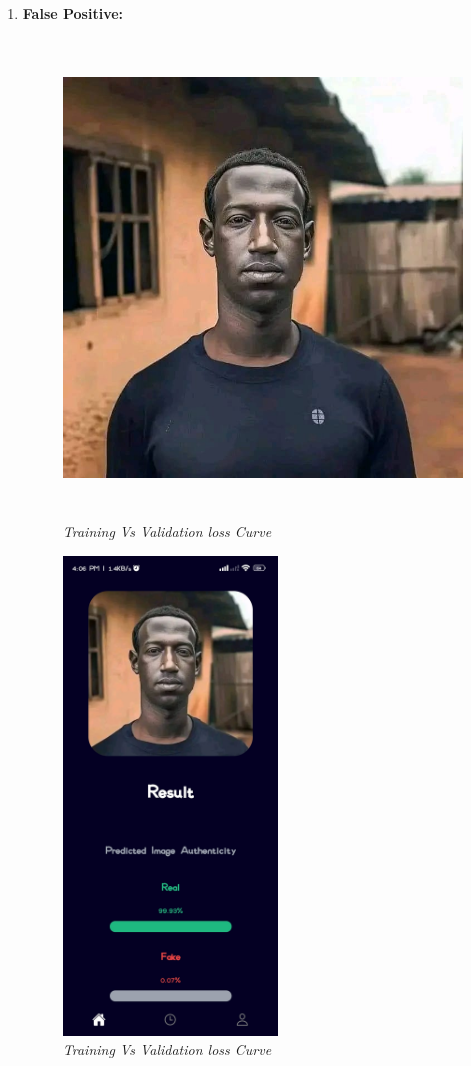 \begin{enumerate}
          \newpage
    \item \textbf{False Positive:}
          \begin{figure}[ht]
              \centering
              \includegraphics[width= 5in, height =5in ]{img/blckZuke.png}
              \caption{\textit{Training Vs Validation loss Curve}}
          \end{figure}
          \begin{figure}[ht]
              \centering
              \includegraphics[height =5in  ]{img/blckzukeOutput.jpg}
              \caption{\textit{Training Vs Validation loss Curve}}
          \end{figure}


\end{enumerate}
